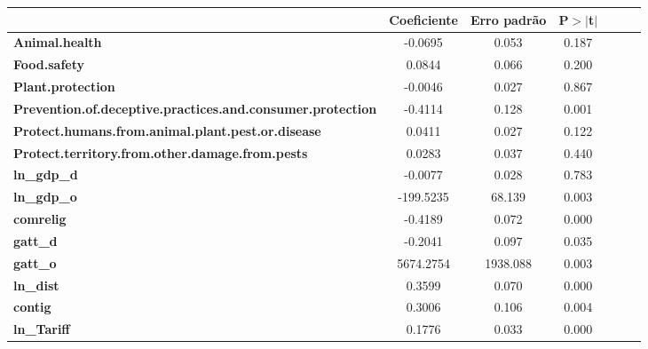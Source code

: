 \begin{center}
\begin{tabular}{lcccccc}
                                                                   & \textbf{Coeficiente} & \textbf{Erro padrão} & \textbf{P$> |$t$|$}\\
\midrule
\textbf{Animal.health}                                             &      -0.0695  &        0.053     &         0.187\\
\textbf{Food.safety}                                               &       0.0844  &        0.066     &         0.200\\
\textbf{Plant.protection}                                          &      -0.0046  &        0.027     &         0.867\\
\textbf{Prevention.of.deceptive.practices.and.consumer.protection} &      -0.4114  &        0.128     &         0.001\\
\textbf{Protect.humans.from.animal.plant.pest.or.disease}          &       0.0411  &        0.027     &         0.122\\
\textbf{Protect.territory.from.other.damage.from.pests}            &       0.0283  &        0.037     &         0.440\\
\textbf{ln\_gdp\_d}                                                &      -0.0077  &        0.028     &         0.783\\
\textbf{ln\_gdp\_o}                                                &    -199.5235  &       68.139     &         0.003\\
\textbf{comrelig}                                                  &      -0.4189  &        0.072     &         0.000\\
\textbf{gatt\_d}                                                   &      -0.2041  &        0.097     &         0.035\\
\textbf{gatt\_o}                                                   &    5674.2754  &     1938.088     &         0.003\\
\textbf{ln\_dist}                                                  &       0.3599  &        0.070     &         0.000\\
\textbf{contig}                                                    &       0.3006  &        0.106     &         0.004\\
\textbf{ln\_Tariff}                                                &       0.1776  &        0.033     &         0.000\\
\bottomrule
\end{tabular}
\end{center}